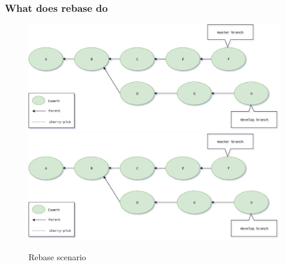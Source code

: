 \begin{frame}
    \frametitle{What does rebase do}
    \addtocounter{page}{-1}
    \begin{figure}
        \begin{center}
            {
                \includegraphics[width=1\textwidth,keepaspectratio]{./images/Rebase.png}
            }
            {
                \includegraphics[height=0.75\textheight,keepaspectratio]{./images/Rebase.png}
            }
            \caption{Rebase scenario}
        \end{center}
    \end{figure}
\end{frame}

